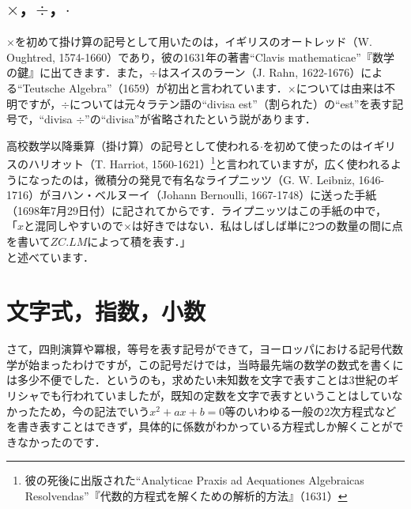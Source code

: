 \documentclass[./main]{subfile}
\begin{document}
\subsection{$\times$，$\div$，$\cdot$}\label{乗除}
$\times$を初めて掛け算の記号として用いたのは，イギリスのオートレッド（W. Oughtred, 1574-1660）であり，彼の1631年の著書``Clavis mathematicae''『数学の鍵』に出てきます．また，$\div$はスイスのラーン（J. Rahn, 1622-1676）による``Teutsche Algebra''（1659）が初出と言われています．$\times$については由来は不明ですが，$\div$については元々ラテン語の``divisa est''（割られた）の``est''を表す記号で，``divisa $\div$''の``divisa''が省略されたという説があります．

高校数学以降乗算（掛け算）の記号として使われる$\cdot$を初めて使ったのはイギリスのハリオット（T. Harriot, 1560-1621）\footnote{彼の死後に出版された``Analyticae Praxis ad Aequationes Algebraicas Resolvendas''『代数的方程式を解くための解析的方法』（1631）}と言われていますが，広く使われるようになったのは，微積分の発見で有名なライプニッツ（G. W. Leibniz, 1646-1716）がヨハン・ベルヌーイ（Johann Bernoulli, 1667-1748）に送った手紙（1698年7月29日付）に記されてからです．ライプニッツはこの手紙の中で，\\
「$x$と混同しやすいので$\times$は好きではない．私はしばしば単に2つの数量の間に点を書いて$ZC.LM$によって積を表す．」\\
と述べています．

\section{文字式，指数，小数}\label{B}
さて，四則演算や冪根，等号を表す記号ができて，ヨーロッパにおける記号代数学が始まったわけですが，この記号だけでは，当時最先端の数学の数式を書くには多少不便でした．というのも，求めたい未知数を文字で表すことは3世紀のギリシャでも行われていましたが，既知の定数を文字で表すということはしていなかったため，今の記法でいう$x^2+ax+b=0$等のいわゆる一般の2次方程式などを書き表すことはできず，具体的に係数がわかっている方程式しか解くことができなかったのです．
\end{document}
